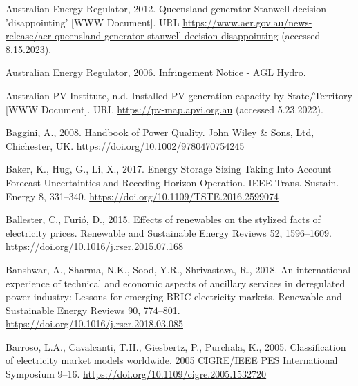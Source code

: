 \documentclass[12pt,a4paper,]{report}
\newlength{\cslhangindent}
\newenvironment{CSLReferences}[2] %
 {%
  \setlength{\parindent}{0pt}
  \ifodd #1 \everypar{\setlength{\hangindent}{\cslhangindent}}\ignorespaces\fi
  \ifnum #2 > 0
  \setlength{\parskip}{#2\baselineskip}
  \fi
 }%
 {}
\begin{document}
\begin{CSLReferences}{1}{0}
\leavevmode{}%
Australian Energy Regulator, 2012. Queensland generator {Stanwell}
decision 'disappointing' {[}WWW Document{]}. URL
\url{https://www.aer.gov.au/news-release/aer-queensland-generator-stanwell-decision-disappointing}
(accessed 8.15.2023).

\leavevmode{}%
Australian Energy Regulator, 2006.
\href{https://www.aer.gov.au/system/files/AGL\%20Infringement\%20Notice.pdf}{Infringement
{Notice} - {AGL Hydro}}.

\leavevmode{}%
Australian PV Institute, n.d. Installed {PV} generation capacity by
{State}/{Territory} {[}WWW Document{]}. URL
\url{https://pv-map.apvi.org.au} (accessed 5.23.2022).

\leavevmode{}%
Baggini, A., 2008. Handbook of {Power Quality}. John Wiley \& Sons, Ltd,
Chichester, UK. \url{https://doi.org/10.1002/9780470754245}

\leavevmode{}%
Baker, K., Hug, G., Li, X., 2017. Energy {Storage Sizing Taking Into
Account Forecast Uncertainties} and {Receding Horizon Operation}. IEEE
Trans. Sustain. Energy 8, 331--340.
\url{https://doi.org/10.1109/TSTE.2016.2599074}

\leavevmode{}%
Ballester, C., Furió, D., 2015. Effects of renewables on the stylized
facts of electricity prices. Renewable and Sustainable Energy Reviews
52, 1596--1609. \url{https://doi.org/10.1016/j.rser.2015.07.168}

\leavevmode{}%
Banshwar, A., Sharma, N.K., Sood, Y.R., Shrivastava, R., 2018. An
international experience of technical and economic aspects of ancillary
services in deregulated power industry: {Lessons} for emerging {BRIC}
electricity markets. Renewable and Sustainable Energy Reviews 90,
774--801. \url{https://doi.org/10.1016/j.rser.2018.03.085}

\leavevmode{}%
Barroso, L.A., Cavalcanti, T.H., Giesbertz, P., Purchala, K., 2005.
Classification of electricity market models worldwide. 2005 CIGRE/IEEE
PES International Symposium 9--16.
\url{https://doi.org/10.1109/cigre.2005.1532720}


\end{CSLReferences}
\end{document}
